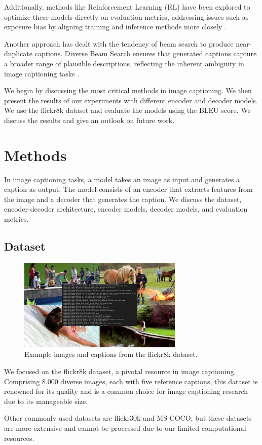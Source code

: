 \documentclass[12pt]{article}
\theoremstyle{plain}
\theoremstyle{definition}
\theoremstyle{remark}
\begin{document}
Additionally, methods like Reinforcement Learning (RL) have been explored to optimize these models directly on evaluation metrics, addressing issues such as exposure bias by aligning training and inference methods more closely \cite{Rennie}.

Another approach has dealt with the tendency of beam search to produce near-duplicate captions. Diverse Beam Search ensures that generated captions capture a broader range of plausible descriptions, reflecting the inherent ambiguity in image captioning tasks \cite{Vijayakumar}.

We begin by discussing the most critical methods in image captioning. We then present the results of our experiments with different encoder and decoder models. We use the flickr8k dataset and evaluate the models using the BLEU score. We discuss the results and give an outlook on future work.



\section{Methods}
\label{sec:methods}

In image captioning tasks, a model takes an image as input and generates a caption as output. The model consists of an encoder that extracts features from the image and a decoder that generates the caption. We discuss the dataset, encoder-decoder architecture, encoder models, decoder models, and evaluation metrics.

\subsection{Dataset}
\begin{figure}[H]
    \centering
    \includegraphics[width=0.7\textwidth]{res/flickr8k.png}
    \caption{Example images and captions from the flickr8k dataset.}
    \label{fig:flickr8k}
\end{figure}
We focused on the flickr8k dataset, a pivotal resource in image captioning. Comprising 8.000 diverse images, each with five reference captions, this dataset is renowned for its quality and is a common choice for image captioning research due to its manageable size.
\par Other commonly used datasets are flickr30k and MS COCO, but these datasets are more extensive and cannot be processed due to our limited computational resources.
\end{document}
